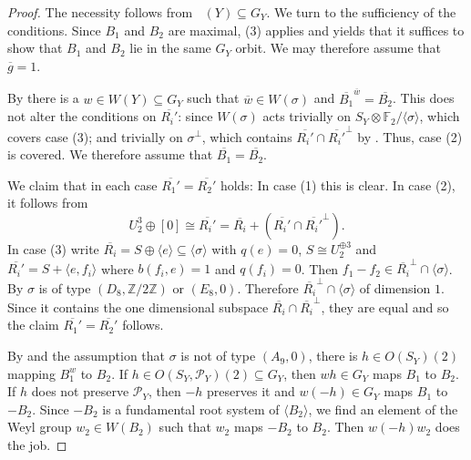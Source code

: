 \documentclass[a4paper]{amsart}
\theoremstyle{definition}
\theoremstyle{plain}
\DeclareMathOperator{\aut}{Aut^*}
\newcommand{\FF}{\mathbb{F}}
\newcommand{\ZZ}{\mathbb{Z}}
\renewcommand{\P}{\mathcal{P}}
\begin{document}
\begin{proof}
The necessity follows from $\aut(Y)\subseteq G_Y$. We turn to the sufficiency of the conditions. 
Since $B_1$ and $B_2$ are maximal,  (3) applies and yields that it suffices to show that $B_1$ and $B_2$ lie in the same $G_Y$ orbit. We may therefore assume that $\overline g =1$.

By  there is a $w \in  W(Y) \subseteq G_Y$ such that $\overline{w} \in W(\sigma)$ and $\overline{B_1}^{\overline{w}}=\overline{B_2}$. 
This does not alter the conditions on $\overline{R_i'}$: since $W(\sigma)$ acts trivially on $S_Y\otimes \FF_2/\langle \sigma \rangle$, which covers case (3); 
and trivially on $\sigma^\perp$, which contains $\overline{R_i'}\cap \overline{R_i'}^\perp$ by . Thus, case (2) is covered.
We therefore assume that $\overline{B_1}=\overline{B_2}$.

We claim that in each case $\overline{R_1'}=\overline{R_2'}$ holds: In case (1) this is clear. 
In case (2), it follows from
\[U_2^3\oplus [0] \cong \overline{R_i'}=\overline{R_i} + \left(\overline{R_i'} \cap \overline{R_i'}^\perp\right).\]
In case (3) write $\overline{R_i}=S\oplus \langle e \rangle \subseteq \langle \sigma \rangle$ with $q(e)=0$, $S\cong U_2^{\oplus 3}$ and
$\overline{R_i'}=S +\langle e, f_i \rangle$ where $b(f_i,e)=1$ and $q(f_i)=0$. 
Then $f_1-f_2 \in \overline{R_i}^\perp \cap \langle \sigma \rangle$. By  $\sigma$ is of type $(D_8, \ZZ/2\ZZ)$ or $(E_8, 0)$. Therefore  
$\overline{R_i}^\perp \cap \langle \sigma \rangle$ of dimension $1$. Since it contains the one dimensional subspace $\overline{R_i}\cap \overline{R_i}^\perp$, they are equal and so the claim $\overline{R_1'}=\overline{R_2'}$ follows.

By  and the assumption that $\sigma$ is not of type $(A_9, 0)$, there is $h \in O(S_Y)(2)$ mapping $B_1^{w}$ to $B_2$.
If $h \in O(S_Y,\P_Y)(2) \subseteq G_Y$, then $wh \in G_Y$ maps $B_1$ to $B_2$.
If $h$ does not preserve $\P_Y$, then $-h$ preserves it and $w(-h) \in G_Y$ maps $B_1$ to $-B_2$. Since $-B_2$ is a fundamental root system of $\langle B_2 \rangle$, we find an element of the Weyl group $w_2 \in W(B_2)$ such that $w_2$ maps $-B_2$ to $B_2$.
Then $w(-h)w_2$ does the job.
\end{proof}
\end{document}
